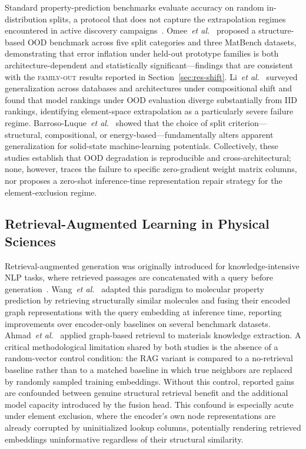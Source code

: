 \documentclass[final,5p,twocolumn,10pt]{elsarticle}
\newcommand{\famout}{\textsc{family-out}}
\newcommand{\etal}{\textit{et al.}}
\begin{document}
Standard property-prediction benchmarks evaluate accuracy on random
in-distribution splits, a protocol that does not capture the extrapolation
regimes encountered in active discovery campaigns~\cite{dunn2020matbench}.
Omee~\etal{}~\cite{omee2024} proposed a structure-based OOD benchmark
across five split categories and three MatBench datasets, demonstrating
that error inflation under held-out prototype families is both architecture-dependent
and statistically significant---findings that are consistent with the
\famout{} results reported in Section~\ref{sec:res-shift}.
Li~\etal{}~\cite{li2024} surveyed generalization across databases and
architectures under compositional shift and found that model rankings
under OOD evaluation diverge substantially from IID rankings, identifying
element-space extrapolation as a particularly severe failure regime.
Barroso-Luque~\etal{}~\cite{barroso2024data} showed that the choice of
split criterion---structural, compositional, or energy-based---fundamentally
alters apparent generalization for solid-state machine-learning potentials.
Collectively, these studies establish that OOD degradation is reproducible
and cross-architectural; none, however, traces the failure to specific
zero-gradient weight matrix columns, nor proposes a zero-shot inference-time
representation repair strategy for the element-exclusion regime.

\subsection{Retrieval-Augmented Learning in Physical Sciences}

Retrieval-augmented generation was originally introduced for knowledge-intensive
NLP tasks, where retrieved passages are concatenated with a query before
generation~\cite{lewis2020retrieval}. Wang~\etal{}~\cite{wang2024rag4mol}
adapted this paradigm to molecular property prediction by retrieving structurally
similar molecules and fusing their encoded graph representations with the
query embedding at inference time, reporting improvements over encoder-only
baselines on several benchmark datasets. Ahmad~\etal{}~\cite{grag2024}
applied graph-based retrieval to materials knowledge extraction.
A critical methodological limitation shared by both studies is the absence
of a random-vector control condition: the RAG variant is compared to a
no-retrieval baseline rather than to a matched baseline in which true
neighbors are replaced by randomly sampled training embeddings.
Without this control, reported gains are confounded between genuine
structural retrieval benefit and the additional model capacity introduced
by the fusion head. This confound is especially acute under element exclusion,
where the encoder's own node representations are already corrupted by
uninitialized lookup columns, potentially rendering retrieved embeddings
uninformative regardless of their structural similarity.
\end{document}
